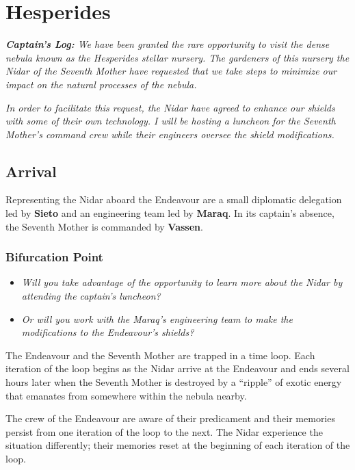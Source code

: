 \documentclass[11pt, a5paper, parskip=half-, DIV=12]{scrartcl}
\begin{document}
\section*{Hesperides}
\textit{\textbf{Captain's Log:} We have been granted the rare opportunity to visit the dense nebula known as the Hesperides stellar nursery. The gardeners of this nursery \textemdash{} the Nidar of the Seventh Mother \textemdash{} have requested that we take steps to minimize our impact on the natural processes of the nebula.}

\textit{In order to facilitate this request, the Nidar have agreed to enhance our shields with some of their own technology. I will be hosting a luncheon for the Seventh Mother's command crew while their engineers oversee the shield modifications.}

\subsection*{Arrival}
Representing the Nidar aboard the Endeavour are a small diplomatic delegation led by \textbf{Sieto} and an engineering team led by \textbf{Maraq}.
In its captain's absence, the Seventh Mother is commanded by \textbf{Vassen}.
\subsubsection*{Bifurcation Point}
\begin{itemize}
	\item \textit{Will you take advantage of the opportunity to learn more about the Nidar by attending the captain's luncheon?} 
	\item \textit{Or will you work with the Maraq's engineering team to make the modifications to the Endeavour's shields?} 
\end{itemize}

The Endeavour and the Seventh Mother are trapped in a time loop. Each iteration of the loop begins as the Nidar arrive at the Endeavour and ends several hours later when the Seventh Mother is destroyed by a ``ripple'' of exotic energy that emanates from somewhere within the nebula nearby.

The crew of the Endeavour are aware of their predicament and their memories persist from one iteration of the loop to the next.  The Nidar experience the situation differently; their memories reset at the beginning of each iteration of the loop.
\end{document}
